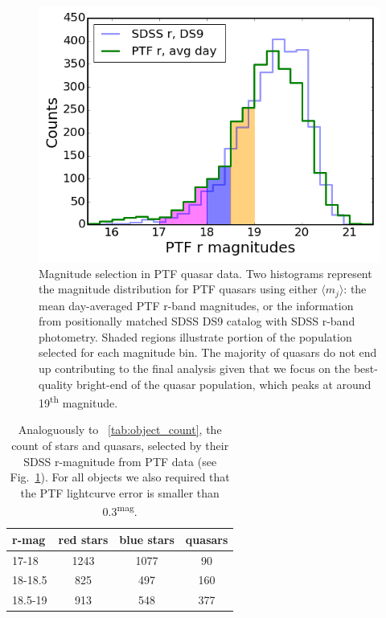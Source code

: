 \documentclass[fleqn,usenatbib]{mnras}  %
\begin{document}
\begin{figure}
\label{fig:2a}
 \includegraphics[width=1\columnwidth, center]{Fig_2_Quasar_PTF_population_selection.png}
 \caption{Magnitude selection in PTF quasar data. Two histograms represent the magnitude distribution for PTF quasars using either   $\langle m_{j} \rangle $: the mean day-averaged PTF r-band magnitudes, or the information from positionally  matched SDSS DS9 catalog  with  SDSS r-band photometry. Shaded regions illustrate portion of the population selected for each magnitude bin. The majority of quasars do not end up contributing to the final analysis given that we focus on the best-quality bright-end of the quasar population, which peaks  at around 19\textsuperscript{th} magnitude.   }
\end{figure}


\begin{table}
\centering
\caption{Analoguously to ~\ref{tab:object_count}, the count of stars and quasars, selected by their SDSS r-magnitude from PTF data (see Fig.~\ref{fig:2a}). For all objects we also required that the PTF lightcurve error is smaller than 0.3\textsuperscript{mag}.}
\label{tab:object_count_PTF}
\begin{tabular}{ l|ccc } 
r-mag  & red stars & blue stars & quasars \\ 
 \hline
17-18   & 1243 & 1077   & 90    \\ 
18-18.5 & 825 &  497  & 160   \\ 
18.5-19 & 913 &  548  & 377   
\end{tabular}
\end{table}
\end{document}
